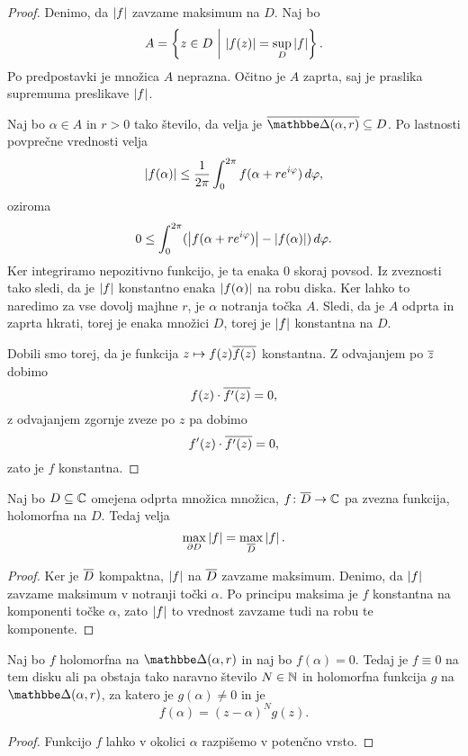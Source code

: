 \begin{proof}
Denimo, da $\left\lvert f\right\rvert$ zavzame maksimum na $D$. Naj bo
\[
A = \left\{z \in D~\middle\vert~\left\lvert f(z)\right\rvert = \sup_D \left\lvert f\right\rvert\right\}.
\]
Po predpostavki je množica $A$ neprazna. Očitno je $A$ zaprta, saj
je praslika supremuma preslikave $\left\lvert f\right\rvert$.

Naj bo $\alpha \in A$ in $r > 0$ tako število, da velja je
$\oline{\dsk(\alpha, r)} \subseteq D$. Po lastnosti povprečne
vrednosti velja
\[
\left\lvert f(\alpha)\right\rvert \leq \frac{1}{2 \pi}
\int_0^{2 \pi} f(\alpha + re^{i \varphi})\,d\varphi,
\]
oziroma
\[
0 \leq \int_0^{2 \pi}
(\left\lvert f(\alpha + re^{i \varphi})\right\rvert - \left\lvert f(\alpha)\right\rvert)\,d\varphi.
\]
Ker integriramo nepozitivno funkcijo, je ta enaka $0$ skoraj
povsod. Iz zveznosti tako sledi, da je $\left\lvert f\right\rvert$ konstantno enaka
$\left\lvert f(\alpha)\right\rvert$ na robu diska. Ker lahko to naredimo za vse
dovolj majhne $r$, je $\alpha$ notranja točka $A$. Sledi, da je $A$
odprta in zaprta hkrati, torej je enaka množici $D$, torej je
$\left\lvert f\right\rvert$ konstantna na $D$.

Dobili smo torej, da je funkcija $z \mapsto f(z) \overline{f(z)}$
konstantna. Z odvajanjem po $\overline{z}$ dobimo
\[
f(z) \cdot \overline{f'(z)} = 0,
\]
z odvajanjem zgornje zveze po $z$ pa dobimo
\[
f'(z) \cdot \overline{f'(z)} = 0,
\]
zato je $f$ konstantna.
\end{proof}

\begin{posledica}
Naj bo $D \subseteq \mathbb{C}$ omejena odprta množica množica,
$f \colon \overline{D} \to \mathbb{C}$ pa zvezna funkcija, holomorfna na $D$.
Tedaj velja
\[
\max_{\partial D} \left\lvert f\right\rvert = \max_{\overline{D}} \left\lvert f\right\rvert.
\]
\end{posledica}

\begin{proof}
Ker je $\overline{D}$ kompaktna, $\left\lvert f\right\rvert$ na $\overline{D}$ zavzame
maksimum. Denimo, da $\left\lvert f\right\rvert$ zavzame maksimum v notranji točki
$\alpha$. Po principu maksima je $f$ konstantna na komponenti točke
$\alpha$, zato $\left\lvert f\right\rvert$ to vrednost zavzame tudi na robu te
komponente.
\end{proof}

\begin{trditev}
Naj bo $f$ holomorfna na $\dsk(\alpha, r)$ in naj bo
$f(\alpha) = 0$. Tedaj je $f \equiv 0$ na tem disku ali pa obstaja
tako naravno število $N \in \mathbb{N}$ in holomorfna funkcija $g$ na
$\dsk(\alpha, r)$, za katero je $g(\alpha) \ne 0$ in je
\[
f(\alpha) = (z - \alpha)^N g(z).
\]
\end{trditev}

\begin{proof}
Funkcijo $f$ lahko v okolici $\alpha$ razpišemo v potenčno vrsto.
\end{proof}

